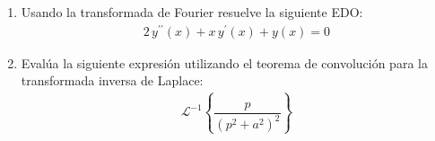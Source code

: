 \documentclass[hidelinks,12pt]{article}
\newcommand{\pderivada}[1]{\ensuremath{{#1}^{\prime}}}
\newcommand{\sderivada}[1]{\ensuremath{{#1}^{\prime \prime}}}
\def\scaleint#1{\vcenter{\hbox{\scaleto[3ex]{\displaystyle\int}{#1}}}}
\def\bs{\mkern-12mu}
\begin{document}
\begin{enumerate}[resume]
La función $\sin^{3} \theta$ es impar respecto a $\theta = \pi$, mientras que $P_n (\cos\theta)$ es par o impar dependiendo de $n$. El integrando completo resulta ser una función impar sobre el intervalo $[0, 2 \pi]$, por lo tanto, la contribución total de la integral se anula.

Se concluye entonces que:
\begin{align*}
\boxed{
\scaleint{6ex}_{\bs 0}^{2 \pi} \sin^{2} \theta \, P_{n}^{1} (\cos\theta) \dd{\theta} = 0 \qquad \text{para todo } n \geq 1.
}
\end{align*}

\item Usando la transformada de Fourier resuelve la siguiente EDO:
\begin{align*}
    2 \, \sderivada{y} (x) +  x \, \pderivada{y} (x) + y (x) = 0
\end{align*}
\item Evalúa la siguiente expresión utilizando el teorema de convolución para la transformada inversa de Laplace:
\begin{align*}
    \mathcal{L}^{-1} \left\{ \dfrac{p}{(p^{2} + a^{2})^{2}} \right\}
\end{align*}
\end{enumerate}
\end{document}
